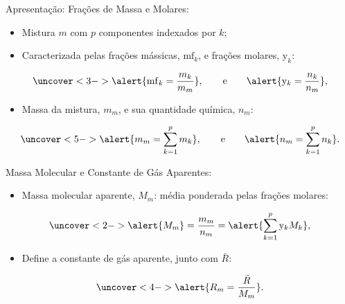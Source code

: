     \begin{frame}{Apresentação: Frações de Massa e Molares:}\vspace*{-2em}
        \begin{itemize}
            \item<1-> Mistura \alert{$m$} com \alert{$p$} componentes indexados por \alert{$k$};
            \item<2-> Caracterizada pelas frações mássicas, \alert{$\mathrm{mf}_k$}, e frações
                molares, \alert{$\mathrm{y}_k$}:
        \end{itemize}
        \vspace*{0.8em}\begin{equation*}
            \uncover<3->{
                \alert{\mathrm{mf}_k = \frac{m_k}{m_m}},\qquad\mbox{e}\qquad
                \alert{\mathrm{y}_k  = \frac{n_k}{n_m}},
            }
        \end{equation*}
        \begin{itemize}
            \item<4-> Massa da mistura, \alert{$m_m$}, e sua quantidade química, \alert{$n_m$}:
        \end{itemize}
        \vspace*{0.8em}\begin{equation*}
            \uncover<5->{
                \alert{m_m = \sum_{k=1}^p m_k},\qquad\mbox{e}\qquad
                \alert{n_m = \sum_{k=1}^p n_k}.
            }
        \end{equation*}
    \end{frame}

    \begin{frame}{Massa Molecular e Constante de Gás Aparentes:}\vspace*{-2em}
        \begin{itemize}
            \item<1-> Massa molecular aparente, \alert{$M_m$}: média ponderada pelas
                \alert{frações molares}:
        \end{itemize}
        \begin{equation*}
            \uncover<2->{
                \alert{M_m} = \frac{m_m}{n_m} = \alert{\sum_{k=1}^p \mathrm{y}_k M_k},
            }
        \end{equation*}
        \begin{itemize}
            \item<3-> Define a constante de gás aparente, junto com $\bar{R}$:
        \end{itemize}
        \begin{equation*}
            \uncover<4->{
                \alert{R_m = \frac{\bar{R}}{M_m}}.
            }
        \end{equation*}
    \end{frame}

